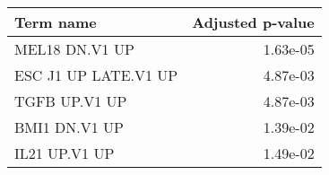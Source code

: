 \begin{tabular}{lr}
\toprule
            Term name &  Adjusted p-value \\
\midrule
       MEL18 DN.V1 UP &          1.63e-05 \\
 ESC J1 UP LATE.V1 UP &          4.87e-03 \\
        TGFB UP.V1 UP &          4.87e-03 \\
        BMI1 DN.V1 UP &          1.39e-02 \\
        IL21 UP.V1 UP &          1.49e-02 \\
\bottomrule
\end{tabular}
